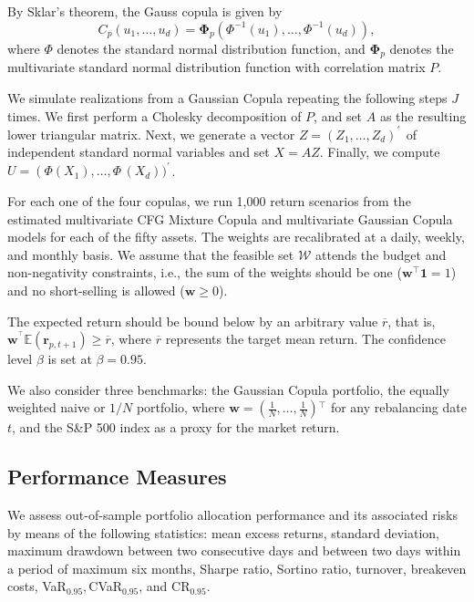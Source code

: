 \documentclass[a4paper,10pt]{article}
\begin{document}
By Sklar's theorem, the Gauss copula is given by
\begin{equation}C_{p}\left (u_{1},\ldots,u_{d}\right ) =\mathbf{\Phi }_{p}\left (\Phi ^{ -1}(u_{1}),\ldots,\Phi ^{ -1}(u_{d})\right ),
\end{equation}
where $\Phi $ denotes the standard normal distribution function, and $\mathbf{\Phi }_{p}$ denotes the multivariate standard normal distribution function with correlation matrix $P$. 

We simulate realizations from a Gaussian Copula repeating the following steps $J$ times. We first perform a Cholesky decomposition of $P$, and set $A$ as the resulting lower triangular matrix. Next, we generate a vector $Z =\left (Z_{1},\ldots,Z_{d}\right )^{ \prime ^{\,}}$ of independent standard normal variables and set $X =AZ$. Finally, we compute $U =\left (\Phi (X_{1})\right .,\ldots,\Phi ^{\,}(X_{d}))^{ \prime ^{\,}}$.

For each one of the four copulas, we run 1,000 return scenarios from the estimated multivariate CFG Mixture Copula and multivariate Gaussian Copula models for each of the fifty assets. The weights are recalibrated at a daily, weekly, and monthly basis. We assume that the feasible set $\mathcal{W}$ attends the budget and non-negativity constraints, i.e., the sum of the weights should be one ($\mathbf{w}^{\top }\mathbf{1=}1$) and no short-selling is allowed ($\mathbf{w\geq }0$).

The expected return should be bound below by an arbitrary value $\overline{r}$, that is, $\mathbf{w}^{^{\top }}\mathbb{E}\left( \mathbf{r}_{p,t+1}\right) \mathbf{\geq }\overline{r}$, where $\overline{r}$ represents the target mean return. The confidence level $\beta $ is set at $\beta =0.95$.

We also consider three benchmarks: the Gaussian Copula portfolio, the equally weighted naive or $1/N$ portfolio, where $\mathbf{w=}\left( \frac{1}{N},\ldots,\frac{1}{N}\right) {^{\top }}$ for
any rebalancing date $t$, and the S\&P 500 index as a proxy for the market return.


\subsection{Performance Measures}

 We assess out-of-sample portfolio allocation performance and its associated risks by means of the following statistics: mean excess returns, standard deviation, maximum drawdown between two consecutive days and between two days within a period of maximum six months, Sharpe ratio, Sortino ratio, turnover, breakeven costs, VaR$_{0.95}, $CVaR$_{0.95}$, and CR$_{0.95}$.
\end{document}
